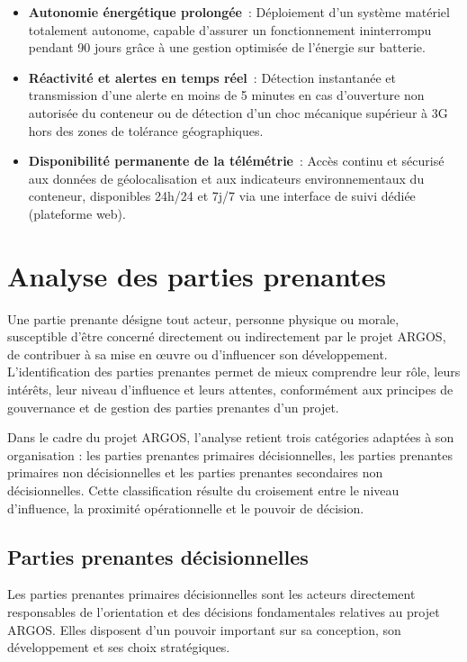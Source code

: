 \begin{itemize}[label=\textcolor{argosblue}{\textbf{>}}]
\item \textbf{Autonomie énergétique prolongée}~: 
Déploiement d'un système matériel totalement autonome, capable d'assurer un fonctionnement ininterrompu pendant 90 jours grâce à une gestion optimisée de l'énergie sur batterie.

\item \textbf{Réactivité et alertes en temps réel}~: 
Détection instantanée et transmission d'une alerte en moins de 5 minutes en cas d'ouverture non autorisée du conteneur ou de détection d'un choc mécanique supérieur à 3G hors des zones de tolérance géographiques.

\item \textbf{Disponibilité permanente de la télémétrie}~: 
Accès continu et sécurisé aux données de géolocalisation et aux indicateurs environnementaux du conteneur, disponibles 24h/24 et 7j/7 via une interface de suivi dédiée (plateforme web).
\end{itemize}

\section{Analyse des parties prenantes}

Une partie prenante désigne tout acteur, personne physique ou morale, susceptible d’être concerné directement ou indirectement par le projet ARGOS, de contribuer à sa mise en œuvre ou d’influencer son développement. L’identification des parties prenantes permet de mieux comprendre leur rôle, leurs intérêts, leur niveau d’influence et leurs attentes, conformément aux principes de gouvernance et de gestion des parties prenantes d’un projet\cite{iso21502}.

Dans le cadre du projet ARGOS, l’analyse retient trois catégories adaptées à son organisation : les parties prenantes primaires décisionnelles, les parties prenantes primaires non décisionnelles et les parties prenantes secondaires non décisionnelles. Cette classification résulte du croisement entre le niveau d’influence, la proximité opérationnelle et le pouvoir de décision.

\subsection{Parties prenantes décisionnelles}

Les parties prenantes primaires décisionnelles sont les acteurs directement responsables de l’orientation et des décisions fondamentales relatives au projet ARGOS. Elles disposent d’un pouvoir important sur sa conception, son développement et ses choix stratégiques.

